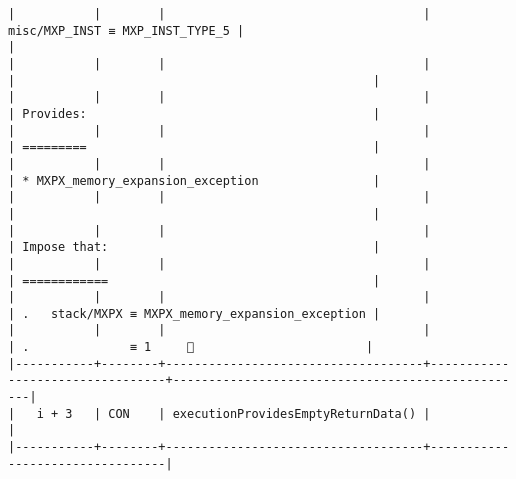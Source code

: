 \documentclass[varwidth=\maxdimen,margin=0.5cm,multi={verbatim}]{standalone}
\begin{document}
\begin{verbatim}
|           |        |                                    | misc/MXP_INST ≡ MXP_INST_TYPE_5 |                                                  |
|           |        |                                    |                                 |                                                  |
|           |        |                                    |                                 | Provides:                                        |
|           |        |                                    |                                 | =========                                        |
|           |        |                                    |                                 | * MXPX_memory_expansion_exception                |
|           |        |                                    |                                 |                                                  |
|           |        |                                    |                                 | Impose that:                                     |
|           |        |                                    |                                 | ============                                     |
|           |        |                                    |                                 | .   stack/MXPX ≡ MXPX_memory_expansion_exception |
|           |        |                                    |                                 | .              ≡ 1     👋                        |
|-----------+--------+------------------------------------+---------------------------------+--------------------------------------------------|
|   i + 3   | CON    | executionProvidesEmptyReturnData() |                                 |
|-----------+--------+------------------------------------+---------------------------------|


\end{verbatim}
\end{document}
